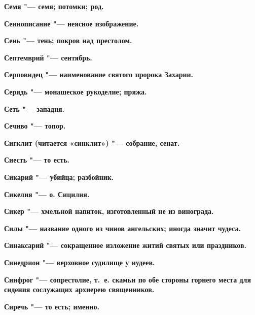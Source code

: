 \begin{multicols}{2}
\bfseries Семя\normalfont{} "--- семя; потомки; род. 




\bfseries Сеннописание\normalfont{} "--- неясное изображение. 




\bfseries Сень\normalfont{} "--- тень; покров над престолом. 




\bfseries Септемврий\normalfont{} "--- сентябрь. 




\bfseries Серповидец\normalfont{} "--- наименование святого пророка Захарии. 




\bfseries Серядь\normalfont{} "--- монашеское рукоделие; пряжа. 




\bfseries Сеть\normalfont{} "--- западня. 




\bfseries Сечиво\normalfont{} "--- топор. 




\bfseries Сигклит\normalfont{} (читается «синклит») "--- собрание, сенат. 




\bfseries Сиесть\normalfont{} "--- то есть. 




\bfseries Сикарий\normalfont{} "--- убийца; разбойник. 




\bfseries Сикелия\normalfont{} "--- о. Сицилия. 




\bfseries Сикер\normalfont{} "--- хмельной напиток, изготовленный не из винограда. 




\bfseries Силы\normalfont{} "--- название одного из чинов ангельских; иногда значит чудеса. 




\bfseries Синаксарий\normalfont{} "--- сокращенное изложение житий святых или праздников. 




\bfseries Синедрион\normalfont{} "--- верховное судилище у иудеев. 




\bfseries Синфрог\normalfont{} "--- сопрестолие, т.~е. скамьи по обе стороны горнего места для сидения сослужащих архиерею священников. 




\bfseries Сиречь\normalfont{} "--- то есть; именно. 





\end{multicols}
